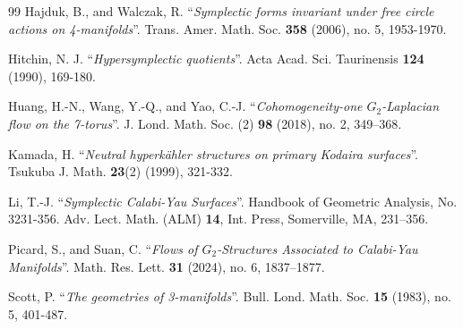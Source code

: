 \documentclass[11pt]{amsart}
\theoremstyle{plain}
\theoremstyle{definition}
\theoremstyle{plain}
\theoremstyle{definition}
\numberwithin{equation}{section}
\numberwithin{theorem}{section}
\begin{document}
\begin{thebibliography}{99}
Hajduk, B., and Walczak, R. ``\emph{Symplectic forms invariant under free circle actions on 4-manifolds}''. Trans. Amer. Math. Soc. {\bf{358}} (2006), no. 5, 1953-1970.
   
Hitchin, N. J. ``\emph{Hypersymplectic quotients}''.  Acta Acad. Sci. Taurinensis {\bf{124}} (1990), 169-180.

 Huang, H.-N., Wang, Y.-Q., and Yao, C.-J. ``\emph{Cohomogeneity-one $G_2$-Laplacian flow on the 7-torus}''. J. Lond. Math. Soc. (2) {\bf{98}} (2018), no. 2, 349–368.
 
 Kamada, H. ``\emph{Neutral hyperk\"ahler structures on primary Kodaira surfaces}''. Tsukuba J. Math. {\bf{23}}(2) (1999), 321-332.

 Li, T.-J. ``\emph{Symplectic Calabi-Yau Surfaces}''. Handbook of Geometric Analysis, No. 3231-356. Adv. Lect. Math. (ALM) {\bf{14}}, Int. Press, Somerville, MA, 231–356. 

Picard, S., and Suan, C. ``\emph{Flows of $G_2$-Structures Associated to Calabi-Yau Manifolds}''. Math. Res. Lett. {\bf{31}} (2024),
no. 6, 1837–1877.


 Scott, P. ``\emph{The geometries of 3-manifolds}''. Bull. Lond. Math. Soc. {\bf{15}} (1983), no. 5, 401-487.


\end{thebibliography}
\end{document}

